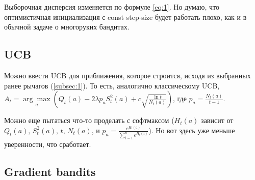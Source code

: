 \documentclass{article}
\begin{document}
Выборочная дисперсия изменяется по формуле \ref{eq:1}. Но думаю, что оптимистичная инициализация с const step-size будет работать плохо, как и в обычной задаче о многоруких бандитах.

\subsection{UCB}
Можно ввести UCB для приближения, которое строится, исходя из выбранных ранее рычагов (\ref{subsec:1}). То есть, аналогично классическому UCB, $A_t = \underset{a}{\arg \max} \left( Q_t(a) - 2 \lambda p_a S_t^2(a) + c \sqrt{\frac{\ln t}{N_t(a)}} \right)$, где $p_a = \frac{N_t(a)}{t-1}$.

Можно еще пытаться что-то проделать с софтмаксом ($H_t(a)$ зависит от $Q_t(a), \, S_t^2(a), \, t, \, N_t(a)$, и $p_a = \frac{e^{H_t(a)}}{\sum_{i=1}^n e^{H_t(i)}}$). Но вот здесь уже меньше уверенности, что сработает.

\subsection{Gradient bandits}
\end{document}
